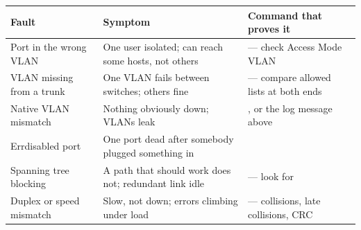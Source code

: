 \begin{longtable}{@{}L{3.6cm}L{5.0cm}L{6.4cm}@{}}
\toprule
{}
\textbf{Fault} & \textbf{Symptom} & \textbf{Command that proves it} \\
\midrule
\endhead
Port in the wrong VLAN & One user isolated; can reach some hosts, not others &
 --- check Access Mode VLAN \\
VLAN missing from a trunk & One VLAN fails between switches; others fine &
 --- compare allowed lists at both ends \\
Native VLAN mismatch & Nothing obviously down; VLANs leak &
, or the log message above \\
Errdisabled port & One port dead after somebody plugged something in &
 \\
Spanning tree blocking & A path that should work does not; redundant link idle &
 --- look for  \\
Duplex or speed mismatch & Slow, not down; errors climbing under load &
 --- collisions, late collisions, CRC \\
\bottomrule
\end{longtable}

